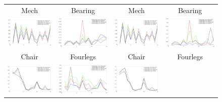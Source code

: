 \documentclass[acmtog,authorversion]{acmart}
\begin{document}
\begin{figure}
\begin{tabular}{cc||cc}
\hline
Mech &Bearing &Mech &Bearing\\
\includegraphics[width=120pt]{FMAP-images/17-STATISTICS-40.jpg}		%
&\includegraphics[width=120pt]{FMAP-images/18-STATISTICS-40.jpg}	%
&\includegraphics[width=120pt]{FMAP-images/17-STATISTICS-40.jpg}	%
&\includegraphics[width=120pt]{FMAP-images/18-STATISTICS-50.jpg}\\	%
\hline
Chair &Fourlegs &Chair &Fourlegs\\
\includegraphics[width=120pt]{FMAP-images/6-STATISTICS-40.jpg}		%
&\includegraphics[width=120pt]{FMAP-images/19-STATISTICS-40.jpg}	%
&\includegraphics[width=120pt]{FMAP-images/6-STATISTICS-50.jpg}		%

\end{tabular}
\end{figure}
\end{document}
